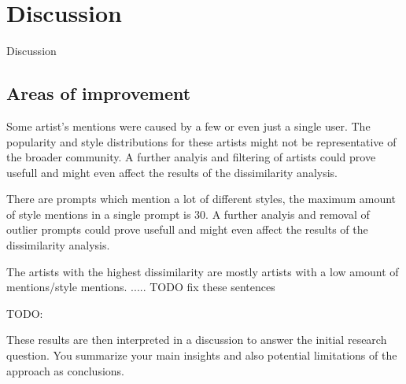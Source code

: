 \chapter{Discussion}
\label{cha:Discussion}
Discussion


\section{Areas of improvement}

Some artist's mentions were caused by a few or even just a single user. The popularity and style distributions for these artists might not be representative of the broader community. A further analyis and filtering of artists could prove usefull and might even affect the results of the dissimilarity analysis.

There are prompts which mention a lot of different styles, the maximum amount of style mentions in a single prompt is 30. A further analyis and removal of outlier prompts could prove usefull and might even affect the results of the dissimilarity analysis.

The artists with the highest dissimilarity are mostly artists with a low amount of mentions/style mentions.  .....
TODO fix these sentences




TODO:

These results are then interpreted in a discussion to
answer the initial research question. You summarize your
main insights and also potential limitations of the approach
as conclusions.